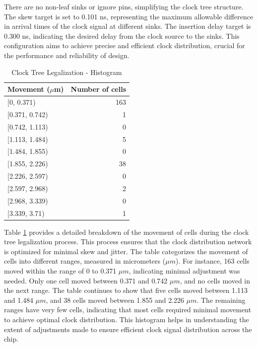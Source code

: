 There are no non-leaf sinks or ignore pins, simplifying the clock tree structure. The skew target is set to 0.101 ns, representing the maximum allowable difference in arrival times of the clock signal at different sinks. The insertion delay target is 0.300 ns, indicating the desired delay from the clock source to the sinks. This configuration aims to achieve precise and efficient clock distribution, crucial for the performance and reliability of design.
\begin{table}[H]
\centering
\caption{Clock Tree Legalization - Histogram}
\begin{tabular}{|l|r|}
\hline
\textbf{Movement ($\mu$m)} & \textbf{Number of cells} \\ \hline
[0, 0.371) & 163 \\ \hline
[0.371, 0.742) & 1 \\ \hline
[0.742, 1.113) & 0 \\ \hline
[1.113, 1.484) & 5 \\ \hline
[1.484, 1.855) & 0 \\ \hline
[1.855, 2.226) & 38 \\ \hline
[2.226, 2.597) & 0 \\ \hline
[2.597, 2.968) & 2 \\ \hline
[2.968, 3.339) & 0 \\ \hline
[3.339, 3.71) & 1 \\ \hline
\end{tabular}
\label{table:clock_tree_histogram}
\end{table}
Table \ref{table:clock_tree_histogram} provides a detailed breakdown of the movement of cells during the clock tree legalization process. This process ensures that the clock distribution network is optimized for minimal skew and jitter. The table categorizes the movement of cells into different ranges, measured in micrometers (\(\mu m\)). For instance, 163 cells moved within the range of 0 to 0.371 \(\mu m\), indicating minimal adjustment was needed. Only one cell moved between 0.371 and 0.742 \(\mu m\), and no cells moved in the next range. The table continues to show that five cells moved between 1.113 and 1.484 \(\mu m\), and 38 cells moved between 1.855 and 2.226 \(\mu m\). The remaining ranges have very few cells, indicating that most cells required minimal movement to achieve optimal clock distribution. This histogram helps in understanding the extent of adjustments made to ensure efficient clock signal distribution across the chip.
